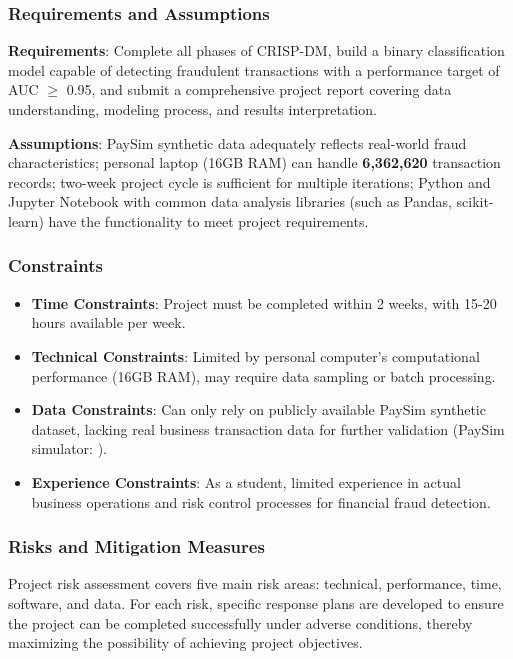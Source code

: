 \documentclass[sigplan,screen]{acmart}
\begin{document}
\subsubsection{Requirements and Assumptions}
\textbf{Requirements}: Complete all phases of CRISP-DM, build a binary classification model capable of detecting fraudulent transactions with a performance target of AUC $\geq$ 0.95, and submit a comprehensive project report covering data understanding, modeling process, and results interpretation.

\textbf{Assumptions}: PaySim synthetic data adequately reflects real-world fraud characteristics; personal laptop (16GB RAM) can handle \textbf{6,362,620} transaction records; two-week project cycle is sufficient for multiple iterations; Python and Jupyter Notebook with common data analysis libraries (such as Pandas, scikit-learn) have the functionality to meet project requirements.

\subsubsection{Constraints}

\begin{itemize}
\item \textbf{Time Constraints}: Project must be completed within 2 weeks, with 15-20 hours available per week.
\item \textbf{Technical Constraints}: Limited by personal computer's computational performance (16GB RAM), may require data sampling or batch processing.
\item \textbf{Data Constraints}: Can only rely on publicly available PaySim synthetic dataset, lacking real business transaction data for further validation (PaySim simulator: \citealp{paysim2016emss}).
\item \textbf{Experience Constraints}: As a student, limited experience in actual business operations and risk control processes for financial fraud detection.
\end{itemize}

\subsubsection{Risks and Mitigation Measures}
Project risk assessment covers five main risk areas: technical, performance, time, software, and data. For each risk, specific response plans are developed to ensure the project can be completed successfully under adverse conditions, thereby maximizing the possibility of achieving project objectives.
\end{document}
